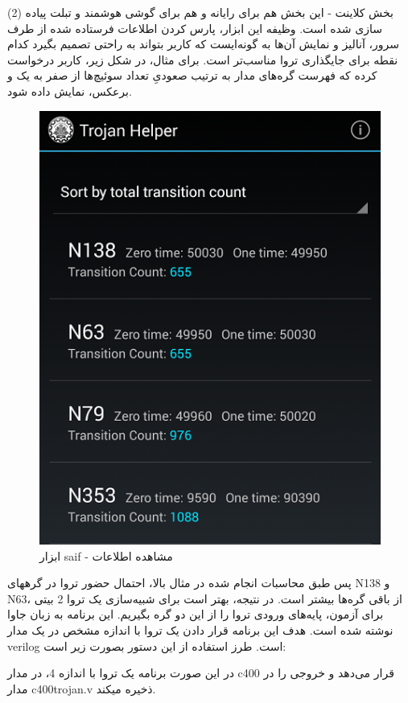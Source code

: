 (2) بخش کلاینت - این بخش هم برای رایانه و هم برای گوشی هوشمند و تبلت پیاده سازی شده است. وظیفه این ابزار، پارس کردن اطلاعات فرستاده شده از طرف سرور، آنالیز و نمایش آن‌ها به گونه‌ایست که کاربر بتواند به راحتی تصمیم بگیرد کدام نقطه برای جایگذاری تروا مناسب‌تر است. برای مثال، در شکل زیر، کاربر درخواست کرده که فهرست گره‌های مدار به ترتیب صعودیِ تعداد سوئیچ‌ها از صفر به یک و برعکس، نمایش داده شود.
\begin{figure}
\begin{center}
\includegraphics[scale=0.8]{figs/android.png}
\caption{ابزار saif - مشاهده اطلاعات}
\label{fig4}
\end{center}
\end{figure}
پس طبق محاسبات انجام شده در مثال بالا، احتمال حضور تروا در گرههای N138 و N63، از باقی گره‌ها بیشتر است. در نتیجه، بهتر است برای شبیه‌سازی یک تروا 2 بیتی برای آزمون، پایه‌های ورودی تروا را از این دو گره بگیریم.
این برنامه  به زبان جاوا نوشته شده است. هدف این برنامه قرار دادن یک تروا با اندازه مشخص در یک مدار verilog است. طرز استفاده از این دستور بصورت زیر است:
\begin{center}


\end{center}
در این صورت برنامه یک تروا با اندازه 4، در مدار c400 قرار می‌دهد و خروجی را در مدار c400trojan.v ذخیره میکند.

